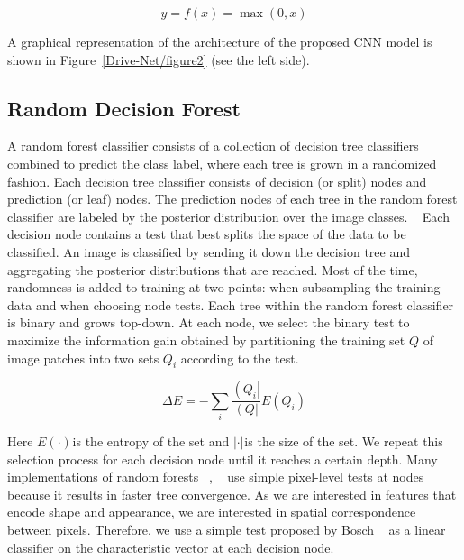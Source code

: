 \begin{equation}
\label{disp-formula-group-e98e45e883854b6aa2d919dcc0573fee}
y=f\left(x\right)=\max(0,x)
\end{equation}

A graphical representation of the architecture of the proposed CNN model is shown in Figure~\ref{Drive-Net/figure2}  (see the left side).

\subsection{Random Decision Forest}A random forest classifier consists of a collection of decision tree classifiers combined to predict the class label, where each tree is grown in a randomized fashion. Each decision tree classifier consists of decision (or split) nodes and prediction (or leaf) nodes. The prediction nodes of each tree in the random forest classifier are labeled by the posterior distribution over the image classes. \unskip~\cite{1641075:26775861} Each decision node contains a test that best splits the space of the data to be classified. An image is classified by sending it down the decision tree and aggregating the posterior distributions that are reached. Most of the time, randomness is added to training at two points: when subsampling the training data and when choosing node tests. Each tree within the random forest classifier is binary and grows top-down. At each node, we select the binary test to maximize the information gain obtained by partitioning the training set $Q$ of image patches into two sets $Q_i$ according to the test.


\begin{equation}
\label{disp-formula-group-d27d73835da3454a817782924579e245}
\Delta E=-{\sum_i{\frac{\left(Q_i\right\vert}{\left(Q\right\vert}E\left(Q_i\right)}}
\end{equation}


Here $E\left(\cdot\right) $\ensuremath{_{}}is the entropy of the set and $\left\vert \cdot\right\vert $\ensuremath{_{}}is the size of the set. We repeat this selection process for each decision node until it reaches a certain depth. Many implementations of random forests \unskip~\cite{1641075:26775846}, \unskip~\cite{1641075:26775849} use simple pixel-level tests at nodes because it results in faster tree convergence. As we are interested in features that encode shape and appearance, we are interested in spatial correspondence between pixels. Therefore, we use a simple test proposed by Bosch \unskip~\cite{1641075:26775861} {\textemdash} as a linear classifier on the characteristic vector {\textemdash} at each decision node.


